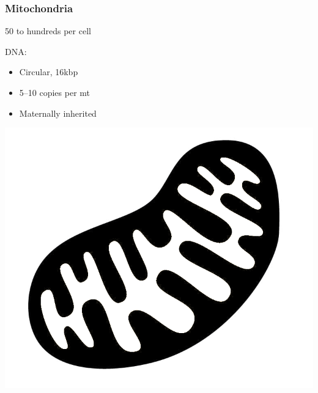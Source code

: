 \documentclass[slidestop,14pt]{beamer}
\begin{document}
\begin{frame}
  \frametitle{Mitochondria}

  \vspace{\baselineskip}

  50 to hundreds per cell

  \vspace{0.5\baselineskip}

  DNA:
  \begin{itemize}
    \item Circular, 16kbp
    \item 5--10 copies per mt
    \item Maternally inherited
  \end{itemize}

  \vspace{-\baselineskip}

  \hspace{0.6\linewidth}\includegraphics[width=0.3\linewidth,transparent]{mitochondrion.png}
\end{frame}
\end{document}
